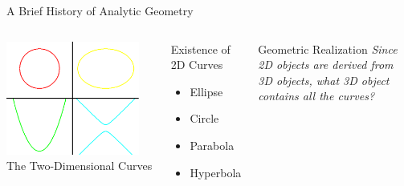 \documentclass[14pt,aspectratio=169]{beamer}
\begin{document}
\begin{frame}{A Brief History of Analytic Geometry}
    \begin{columns}
    \centering
    \includegraphics[width=0.9\textwidth]{image03.png}\\
    The Two-Dimensional Curves
    \begin{block}{Existence of 2D Curves}

        \begin{itemize}
         \item Ellipse
         \item Circle
         \item Parabola
         \item Hyperbola
        \end{itemize}

    \end{block}

    \begin{exampleblock}{Geometric Realization}
        \textit{Since 2D objects are derived from 3D objects, what 3D object contains all the curves?}
    \end{exampleblock}

    \end{columns}


\end{frame}
\end{document}
